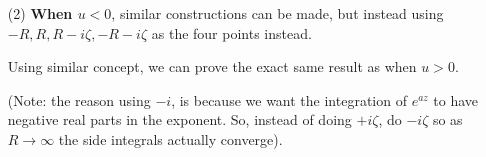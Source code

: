 \documentclass{article}
\begin{document}
\begin{itemize}
    \hfil

    \item[(2)] \textbf{When $u<0$}, similar constructions can be made, but instead using $-R,R,R-i\zeta,-R-i\zeta$ as the four points instead.
    
    \begin{center}
    \end{center}

    Using similar concept, we can prove the exact same result as when $u>0$.

    (Note: the reason using $-i$, is because we want the integration of $e^{az}$ to have negative real parts in the exponent. So, instead of doing $+i\zeta$, do $-i\zeta$ so as $R\rightarrow\infty$ the side integrals actually converge).

    \hfil
    

\end{itemize}
\end{document}
